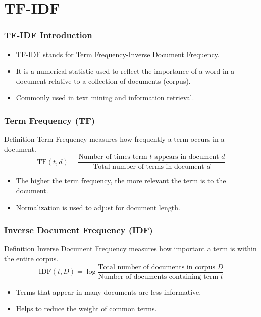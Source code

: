 \documentclass{beamer}
\begin{document}
\section{TF-IDF}

\begin{frame}
    \frametitle{TF-IDF Introduction}
    \begin{itemize}
        \item TF-IDF stands for Term Frequency-Inverse Document Frequency.
        \item It is a numerical statistic used to reflect the importance of a word in a document relative to a collection of documents (corpus).
        \item Commonly used in text mining and information retrieval.
    \end{itemize}
\end{frame}

\begin{frame}
    \frametitle{Term Frequency (TF)}
    \begin{block}{Definition}
        Term Frequency measures how frequently a term occurs in a document.
        \[
        \text{TF}(t, d) = \frac{\text{Number of times term } t \text{ appears in document } d}{\text{Total number of terms in document } d}
        \]
    \end{block}
    \begin{itemize}
        \item The higher the term frequency, the more relevant the term is to the document.
        \item Normalization is used to adjust for document length.
    \end{itemize}
\end{frame}

\begin{frame}
    \frametitle{Inverse Document Frequency (IDF)}
    \begin{block}{Definition}
        Inverse Document Frequency measures how important a term is within the entire corpus.
        \[
        \text{IDF}(t, D) = \log \frac{\text{Total number of documents in corpus } D}{\text{Number of documents containing term } t}
        \]
    \end{block}
    \begin{itemize}
        \item Terms that appear in many documents are less informative.
        \item Helps to reduce the weight of common terms.
    \end{itemize}
\end{frame}
\end{document}
